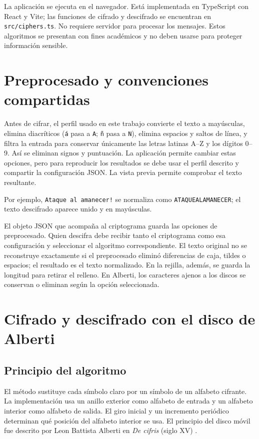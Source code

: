 \documentclass[11pt,a4paper]{article}
\begin{document}
La aplicación se ejecuta en el navegador. Está implementada en TypeScript con React y Vite; las funciones de cifrado y descifrado se encuentran en \texttt{src/ciphers.ts}. No requiere servidor para procesar los mensajes. Estos algoritmos se presentan con fines académicos y no deben usarse para proteger información sensible.

\section{Preprocesado y convenciones compartidas}
Antes de cifrar, el perfil usado en este trabajo convierte el texto a mayúsculas, elimina diacríticos (\texttt{á} pasa a \texttt{A}; \texttt{ñ} pasa a \texttt{N}), elimina espacios y saltos de línea, y filtra la entrada para conservar únicamente las letras latinas A--Z y los dígitos 0--9. Así se eliminan signos y puntuación. La aplicación permite cambiar estas opciones, pero para reproducir los resultados se debe usar el perfil descrito y compartir la configuración JSON. La vista previa permite comprobar el texto resultante.

Por ejemplo, \texttt{Ataque al amanecer!} se normaliza como \texttt{ATAQUEALAMANECER}; el texto descifrado aparece unido y en mayúsculas.

El objeto JSON que acompaña al criptograma guarda las opciones de preprocesado. Quien descifra debe recibir tanto el criptograma como esa configuración y seleccionar el algoritmo correspondiente. El texto original no se reconstruye exactamente si el preprocesado eliminó diferencias de caja, tildes o espacios; el resultado es el texto normalizado. En la rejilla, además, se guarda la longitud para retirar el relleno. En Alberti, los caracteres ajenos a los discos se conservan o eliminan según la opción seleccionada.

\section{Cifrado y descifrado con el disco de Alberti}
\subsection{Principio del algoritmo}
El método sustituye cada símbolo claro por un símbolo de un alfabeto cifrante. La implementación usa un anillo exterior como alfabeto de entrada y un alfabeto interior como alfabeto de salida. El giro inicial y un incremento periódico determinan qué posición del alfabeto interior se usa. El principio del disco móvil fue descrito por Leon Battista Alberti en \textit{De cifris} (siglo XV) \cite{alberti}.
\end{document}
